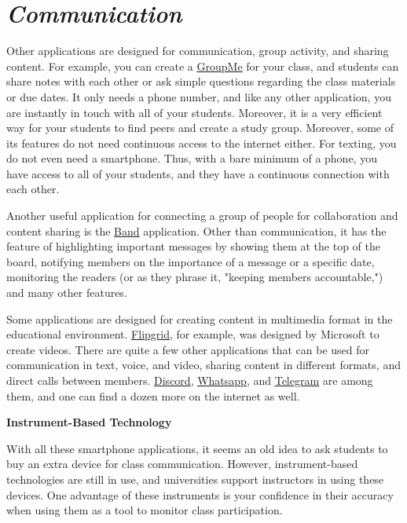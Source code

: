 \documentclass{book}
\begin{document}
\hypertarget{communication}{%
\section{\texorpdfstring{\emph{Communication}}{Communication}}\label{communication}}

Other applications are designed for communication, group activity, and sharing
content. For example, you can create a
\href{https://groupme.com/}{\underline{GroupMe}} for your class, and students
can share notes with each other or ask simple questions regarding the class
materials or due dates. It only needs a phone number, and like any other
application, you are instantly in touch with all of your students. Moreover,
it is a very efficient way for your students to find peers and create a study
group. Moreover, some of its features do not need continuous access to the
internet either. For texting, you do not even need a smartphone. Thus, with a
bare minimum of a phone, you have access to all of your students, and they
have a continuous connection with each other.

Another useful application for connecting a group of people for collaboration
and content sharing is the \href{https://band.us/en}{\underline{Band}}
application. Other than communication, it has the feature of highlighting
important messages by showing them at the top of the board, notifying members
on the importance of a message or a specific date, monitoring the readers (or
as they phrase it, "keeping members accountable,") and many other features.

Some applications are designed for creating content in multimedia format in
the educational environment.
\href{https://info.flipgrid.com/}{\underline{Flipgrid}}, for example, was
designed by Microsoft to create videos. There are quite a few other
applications that can be used for communication in text, voice, and video,
sharing content in different formats, and direct calls between members.
\href{https://discord.com/}{\underline{Discord}},
\href{https://www.whatsapp.com/}{\underline{Whatsapp}}, and
\href{https://telegram.org/}{\underline{Telegram}} are among them, and one can
find a dozen more on the internet as well.

\textbf{Instrument-Based Technology}

With all these smartphone applications, it seems an old idea to ask students
to buy an extra device for class communication. However, instrument-based
technologies are still in use, and universities support instructors in using
these devices. One advantage of these instruments is your confidence in their
accuracy when using them as a tool to monitor class participation.
\end{document}

